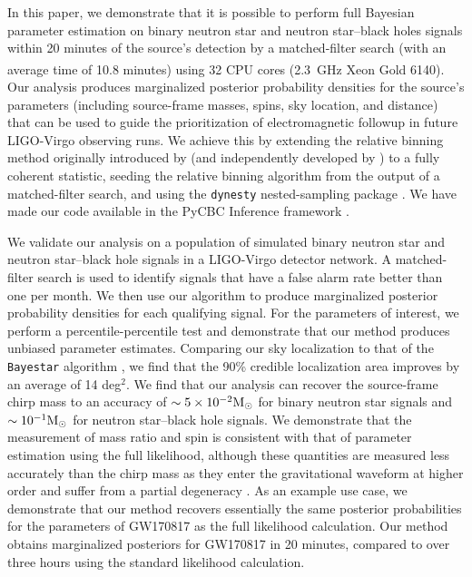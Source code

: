 In this paper, we demonstrate that it is possible to perform full Bayesian parameter estimation on binary neutron star and neutron star--black holes signals within 20 minutes of the source's detection by  a matched-filter search (with an average time of 10.8 minutes) using  32 CPU cores (2.3~GHz Xeon\textsuperscript{\textregistered} Gold 6140). Our analysis produces marginalized posterior probability densities for the source's parameters (including source-frame masses, spins, sky location, and distance) that can be used to guide the prioritization of electromagnetic followup in future LIGO-Virgo observing runs. We achieve this by extending the relative binning method originally introduced by \cite{cornish2013fast} (and independently developed by \cite{Zackay:2018qdy}) to a fully coherent statistic, seeding the relative binning algorithm from the output of a matched-filter search, and using the \texttt{dynesty} nested-sampling package \cite{Speagle_2020}. We have made our code available in the PyCBC Inference framework \cite{Biwer:2018osg}.

We validate our analysis on a population of simulated binary neutron star and neutron star--black hole signals in a LIGO-Virgo detector network. A matched-filter search is used to identify signals that have a false alarm rate better than one per month. We then use our algorithm to produce marginalized posterior probability densities for each qualifying signal. For the parameters of interest, we perform a percentile-percentile test and demonstrate that our method produces unbiased parameter estimates. Comparing our sky localization to that of the \texttt{Bayestar} algorithm \cite{Singer_2016}, we find that the 90\% credible localization area improves by an average of 14 deg$^2$. We find that our analysis can recover the source-frame chirp mass to an accuracy of $\sim 5 \times 10^{-2}\mathrm{M}_{\odot}$ for binary neutron star signals and $\sim 10^{-1}\mathrm{M}_{\odot}$ for neutron star--black hole signals. We demonstrate that the measurement of mass ratio and spin is consistent with that of parameter estimation using the full likelihood, although these quantities are measured less accurately than the chirp mass as they enter the gravitational waveform at higher order and suffer from a partial degeneracy \cite{Cutler:1994ys,Hannam_2013}. As an example use case, we demonstrate that our method recovers essentially the same posterior probabilities for the parameters of GW170817 as the full likelihood calculation. Our method obtains marginalized posteriors for GW170817 in 20 minutes, compared to over three hours using the standard likelihood calculation.

